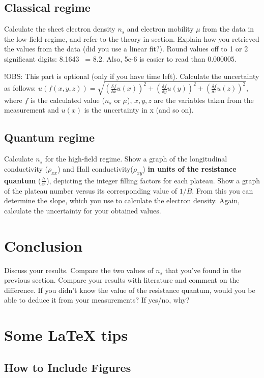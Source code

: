 \documentclass[a4paper]{article}
\begin{document}
\subsection{Classical regime}
Calculate the sheet electron density $n_{s}$ and electron mobility $\mu$ from the data in the low-field regime, and refer to the theory in section. Explain how you retrieved the values from the data (did you use a linear fit?).
Round values off to 1 or 2 significant digits: 8.1643 ~= 8.2. Also, 5e-6 is easier to read than 0.000005.

!OBS: This part is optional (only if you have time left).
Calculate the uncertainty as follows: \newline $u(f(x, y, z)) = \sqrt{(\frac{\delta f}{\delta{x}} u(x))^{2} + (\frac{\delta f}{\delta{y}} u(y))^{2} + (\frac{\delta f}{\delta{z}} u(z))^{2}}$, where $f$ is the calculated value ($n_{s}$ or $\mu$), $x, y, z$ are the variables taken from the measurement and $u(x)$ is the uncertainty in x (and so on).

\subsection{Quantum regime}
Calculate $n_{s}$ for the high-field regime.
Show a graph of the longitudinal conductivity ($\rho_{xx}$) and Hall conductivity($\rho_{xy}$) \textbf{in units of the resistance quantum} ($\frac{h}{e^{2}}$), depicting the integer filling factors for each plateau.
Show a graph of the plateau number versus its corresponding value of $1/B$. From this you can determine the slope, which you use to calculate the electron density.
Again, calculate the uncertainty for your obtained values.

\section{Conclusion}

Discuss your results. Compare the two values of $n_{s}$ that you've found in the previous section. Compare your results with literature and comment on the difference. If you didn't know the value of the resistance quantum, would you be able to deduce it from your measurements? If yes/no, why?

\newpage
\section{Some LaTeX tips}
\label{sec:latex}
\subsection{How to Include Figures}
\end{document}
